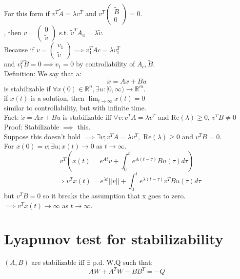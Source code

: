 \documentclass{article}
\begin{document}
For this form if $v^T\tilde{A}=\lambda v^T$ and $v^T\begin{pmatrix}\tilde{B}\\0\end{pmatrix}=0$.\\
, then $v=\begin{pmatrix}0\\\tilde{v}\end{pmatrix}$ s.t. $\tilde{v}^TA_u=\lambda \tilde{v}$.\\
Because if $v=\begin{pmatrix}v_1\\\tilde{v}\end{pmatrix}\implies v_1^TAc=\lambda v_1^T$\\
and $v_1^T\tilde{B}=0\implies v_1=0$ by controllability of $A_c,\tilde{B}$.\\

Definition: We say that a:\\
\[\dot{x}=Ax+Bu\]
is stabilizable if $\forall x(0)\in\mathbb{R}^n, \exists u:[0,\infty)\to\mathbb{R}^m$.\\
if $x(t)$ is a solution, then $\lim_{t\to\infty}x(t)=0$\\
similar to controllability, but with infinite time.\\


Fact: $\dot{x}=Ax+Bu$ is stabilizable iff $\forall v: v^TA=\lambda v^T$ and Re$(\lambda)\geq 0$, $v^TB\neq 0$\\
Proof: Stabilizable $\implies$ this.\\
Suppose this doesn't hold $\implies \exists v; v^TA=\lambda v^T,$ Re$(\lambda)\geq 0$ and $v^TB=0$.\\
For $x(0)=v; \exists u; x(t)\to 0$ as $t\to \infty$.\\
\[v^T\left (x(t)=e^{At}v+\int_0^te^{A(t-\tau)}Bu(\tau)d\tau\right )\]
\[\implies v^Tx(t)=e^{\lambda t}\lvert\lvert v\rvert\rvert+\int_0^te^{\lambda(t-\tau)}v^TBu(\tau)d\tau\]
but $v^TB=0$ so it breaks the assumption that x goes to zero.\\
$\implies v^Tx(t)\to\infty$ as $t\to\infty$.\\


\section{Lyapunov test for stabilizability}
$(A,B)$ are stabilizable iff $\exists$ p.d. W,Q such that:\\
\[AW+A^TW-BB^T=-Q\]
\end{document}
